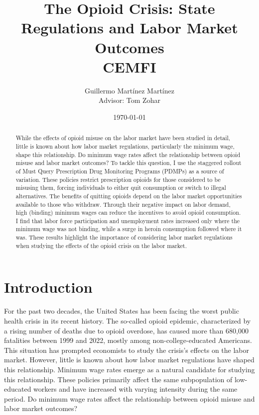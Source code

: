 \documentclass[12pt,a4paper]{article}
\title{The Opioid Crisis: State Regulations and Labor Market Outcomes \\
[2ex] \large CEMFI}
\author{Guillermo Martínez Martínez \\ [2ex] Advisor: Tom Zohar}
\date{\today}
\begin{document}
\maketitle

\begin{abstract}
    \noindent
    While the effects of opioid misuse on the labor market have been studied in detail, little is known about how labor market regulations, particularly the minimum wage, shape this relationship. Do minimum wage rates affect the relationship between opioid misuse and labor market outcomes? To tackle this question, I use the staggered rollout of Must Query Prescription Drug Monitoring Programs (PDMPs) as a source of variation. These policies restrict prescription opioids for those considered to be misusing them, forcing individuals to either quit consumption or switch to illegal alternatives. The benefits of quitting opioids depend on the labor market opportunities available to those who withdraw. Through their negative impact on labor demand, high (binding) minimum wages can reduce the incentives to avoid opioid consumption. I find that labor force participation and unemployment rates increased only where the minimum wage was not binding, while a surge in heroin consumption followed where it was. These results highlight the importance of considering labor market regulations when studying the effects of the opioid crisis on the labor market.
\end{abstract}


\newpage

\section*{Introduction}

For the past two decades, the United States has been facing the worst public health crisis in its recent history.
The so-called opioid epidemic, characterized by a rising number of deaths due to opioid overdose, has caused more than 680,000 fatalities between 1999 and 2022, mostly among non-college-educated Americans.
This situation has prompted economists to study the crisis's effects on the labor market.
However, little is known about how labor market regulations have shaped this relationship.
Minimum wage rates emerge as a natural candidate for studying this relationship.
These policies primarily affect the same subpopulation of low-educated workers and have increased with varying intensity during the same period.
Do minimum wage rates affect the relationship between opioid misuse and labor market outcomes?
\end{document}
